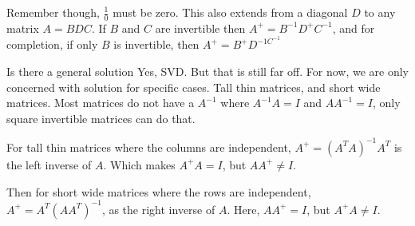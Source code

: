  Remember though, \(\frac{1}{0}\) must be zero. This also extends from a diagonal \(D\) to any matrix \(A = BDC\). If \(B\) and \(C\) are invertible then \(A^+ = B^{-1} D^+ C^{-1}\), and for completion, if only \(B\) is invertible, then \(A^+ = B^+ D^{-1 C^{-1} } \)       

 Is there a general solution Yes, SVD. But that is still far off. For now, we are only concerned with solution for specific cases. Tall thin matrices, and short wide matrices. Most matrices do not have a \(A^{-1} \) where \(A^{-1} A = I \) and \(A A^{-1} = I \), only square invertible matrices can do that.

 For tall thin matrices where the columns are independent, \(A^+ = (A^T A)^{-1} A^T \) is the left inverse of \(A\). Which makes \(A^+ A = I\), but \(A A^+ \neq I\). 
 
 Then for short wide matrices where the rows are independent, \(A^+ = A^T (A A^T)^{-1} \), as the right inverse of \(A\). Here, \(A A^+ = I\), but \(A^+ A \neq I\).  

